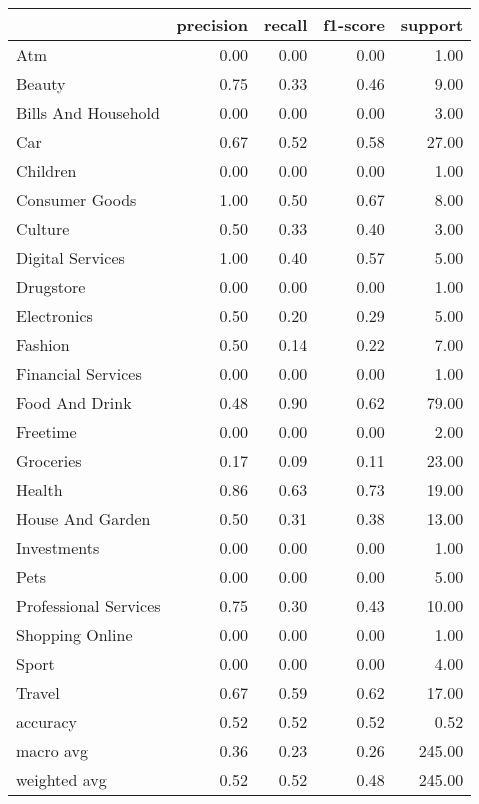 \begin{tabular}{lrrrr}
\toprule
{} &  precision &  recall &  f1-score &  support \\
\midrule
Atm                   &       0.00 &    0.00 &      0.00 &     1.00 \\
Beauty                &       0.75 &    0.33 &      0.46 &     9.00 \\
Bills And Household   &       0.00 &    0.00 &      0.00 &     3.00 \\
Car                   &       0.67 &    0.52 &      0.58 &    27.00 \\
Children              &       0.00 &    0.00 &      0.00 &     1.00 \\
Consumer Goods        &       1.00 &    0.50 &      0.67 &     8.00 \\
Culture               &       0.50 &    0.33 &      0.40 &     3.00 \\
Digital Services      &       1.00 &    0.40 &      0.57 &     5.00 \\
Drugstore             &       0.00 &    0.00 &      0.00 &     1.00 \\
Electronics           &       0.50 &    0.20 &      0.29 &     5.00 \\
Fashion               &       0.50 &    0.14 &      0.22 &     7.00 \\
Financial Services    &       0.00 &    0.00 &      0.00 &     1.00 \\
Food And Drink        &       0.48 &    0.90 &      0.62 &    79.00 \\
Freetime              &       0.00 &    0.00 &      0.00 &     2.00 \\
Groceries             &       0.17 &    0.09 &      0.11 &    23.00 \\
Health                &       0.86 &    0.63 &      0.73 &    19.00 \\
House And Garden      &       0.50 &    0.31 &      0.38 &    13.00 \\
Investments           &       0.00 &    0.00 &      0.00 &     1.00 \\
Pets                  &       0.00 &    0.00 &      0.00 &     5.00 \\
Professional Services &       0.75 &    0.30 &      0.43 &    10.00 \\
Shopping Online       &       0.00 &    0.00 &      0.00 &     1.00 \\
Sport                 &       0.00 &    0.00 &      0.00 &     4.00 \\
Travel                &       0.67 &    0.59 &      0.62 &    17.00 \\
accuracy              &       0.52 &    0.52 &      0.52 &     0.52 \\
macro avg             &       0.36 &    0.23 &      0.26 &   245.00 \\
weighted avg          &       0.52 &    0.52 &      0.48 &   245.00 \\
\bottomrule
\end{tabular}
